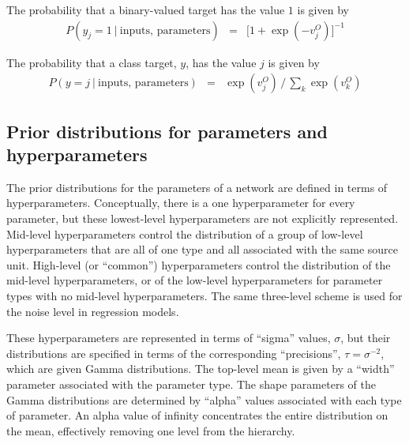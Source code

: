 \documentclass{report}[11pt]
\def\beq{\begin{eqnarray}}
\def\eep{\end{eqnarray}}
\begin{document}
The probability that a binary-valued target has the value $1$ is given by \beq
  P(y_j = 1\ |\ \mbox{inputs},\, \mbox{parameters}) & = & 
    \big[ 1 + \exp(-v^O_j) \big]^{-1}
\label{bin}\eep

The probability that a class target, $y$, has the value $j$ is given by\beq
  P(y = j\ |\ \mbox{inputs},\, \mbox{parameters}) & = & 
    \textstyle \exp(v^O_j) \,\big/\, \sum\limits_k \exp(v^O_k)
\label{softmax}\eep


\subsection*{Prior distributions for parameters and hyperparameters}

The prior distributions for the parameters of a network are defined in
terms of hyperparameters.  Conceptually, there is a one hyperparameter
for every parameter, but these lowest-level hyperparameters are not
explicitly represented.  Mid-level hyperparameters control the
distribution of a group of low-level hyperparameters that are all of
one type and all associated with the same source unit.  High-level (or
``common'') hyperparameters control the distribution of the mid-level
hyperparameters, or of the low-level hyperparameters for parameter
types with no mid-level hyperparameters.  The same three-level scheme
is used for the noise level in regression models.

These hyperparameters are represented in terms of ``sigma'' values,
$\sigma$, but their distributions are specified in terms of the
corresponding ``precisions'', $\tau = \sigma^{-2}$, which are given
Gamma distributions.  The top-level mean is given by a ``width''
parameter associated with the parameter type.  The shape parameters of
the Gamma distributions are determined by ``alpha'' values associated
with each type of parameter.  An alpha value of infinity concentrates
the entire distribution on the mean, effectively removing one level
from the hierarchy.
\end{document}
